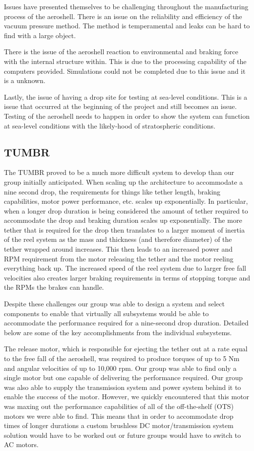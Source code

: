 Issues have presented themselves to be challenging throughout the manufacturing process of the aeroshell. There is an issue on the reliability and efficiency of the vacuum pressure method. The method is temperamental and leaks can be hard to find with a large object. 

There is the issue of the aeroshell reaction to environmental and braking force with the internal structure within. This is due to the processing capability of the computers provided. Simulations could not be completed due to this issue and it is a unknown.

Lastly, the issue of having a drop site for testing at sea-level conditions. This is a issue that occurred at the beginning of the project and still becomes an issue. Testing of the aeroshell needs to happen in order to show the system can function at sea-level conditions with the likely-hood of stratospheric conditions.

\subsection{TUMBR}

\indent\indent The TUMBR proved to be a much more difficult system to develop than our group initially anticipated. When scaling up the architecture to accommodate a nine second drop, the requirements for things like tether length, braking capabilities, motor power performance, etc. scales up exponentially. In particular, when a longer drop duration is being considered the amount of tether required to accommodate the drop and braking duration scales up exponentially. The more tether that is required for the drop then translates to a larger moment of inertia of the reel system as the mass and thickness (and therefore diameter) of the tether wrapped around increases. This then leads to an increased power and RPM requirement from the motor releasing the tether and the motor reeling everything back up. The increased speed of the reel system due to larger free fall velocities also creates larger braking requirements in terms of stopping torque and the RPMs the brakes can handle. 

Despite these challenges our group was able to design a system and select components to enable that virtually all subsystems would be able to accommodate the performance required for a nine-second drop duration. Detailed below are some of the key accomplishments from the individual subsystems. 

The release motor, which is responsible for ejecting the tether out at a rate equal to the free fall of the aeroshell, was required to produce torques of up to 5 Nm and angular velocities of up to 10,000 rpm. Our group was able to find only a single motor but one capable of delivering the performance required. Our group was also able to supply the transmission system and power system behind it to enable the success of the motor. However, we quickly encountered that this motor was maxing out the performance capabilities of all of the off-the-shelf (OTS) motors we were able to find. This means that in order to accommodate drop times of longer durations a custom brushless DC motor/transmission system solution would have to be worked out or future groups would have to switch to AC motors. 

